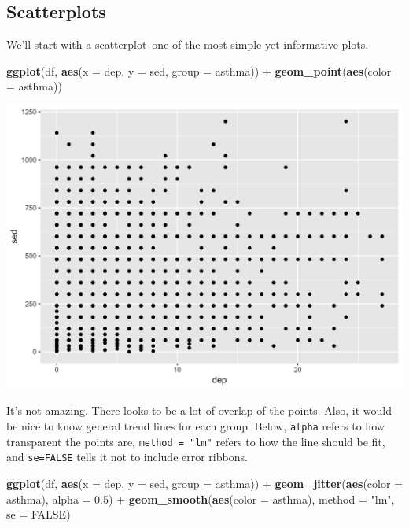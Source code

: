 \documentclass[]{tufte-book}
\newenvironment{Shaded}{}{}
\newcommand{\KeywordTok}[1]{\textcolor[rgb]{0.00,0.44,0.13}{\textbf{#1}}}
\newcommand{\DataTypeTok}[1]{\textcolor[rgb]{0.56,0.13,0.00}{#1}}
\newcommand{\FloatTok}[1]{\textcolor[rgb]{0.25,0.63,0.44}{#1}}
\newcommand{\StringTok}[1]{\textcolor[rgb]{0.25,0.44,0.63}{#1}}
\newcommand{\OtherTok}[1]{\textcolor[rgb]{0.00,0.44,0.13}{#1}}
\newcommand{\OperatorTok}[1]{\textcolor[rgb]{0.40,0.40,0.40}{#1}}
\newcommand{\NormalTok}[1]{#1}
\theoremstyle{definition}
\theoremstyle{definition}
\theoremstyle{remark}
\begin{document}
\subsection*{Scatterplots}\label{scatterplots}

We'll start with a scatterplot--one of the most simple yet informative
plots.

\begin{Shaded}
\begin{Highlighting}[]
\KeywordTok{ggplot}\NormalTok{(df, }\KeywordTok{aes}\NormalTok{(}\DataTypeTok{x =}\NormalTok{ dep, }\DataTypeTok{y =}\NormalTok{ sed, }\DataTypeTok{group =}\NormalTok{ asthma)) }\OperatorTok{+}\StringTok{ }
\StringTok{    }\KeywordTok{geom_point}\NormalTok{(}\KeywordTok{aes}\NormalTok{(}\DataTypeTok{color =}\NormalTok{ asthma))}
\end{Highlighting}
\end{Shaded}

\includegraphics{_main_files/figure-latex/unnamed-chunk-134-1}

It's not amazing. There looks to be a lot of overlap of the points.
Also, it would be nice to know general trend lines for each group.
Below, \texttt{alpha} refers to how transparent the points are,
\texttt{method\ =\ "lm"} refers to how the line should be fit, and
\texttt{se=FALSE} tells it not to include error ribbons.

\begin{Shaded}
\begin{Highlighting}[]
\KeywordTok{ggplot}\NormalTok{(df, }\KeywordTok{aes}\NormalTok{(}\DataTypeTok{x =}\NormalTok{ dep, }\DataTypeTok{y =}\NormalTok{ sed, }\DataTypeTok{group =}\NormalTok{ asthma)) }\OperatorTok{+}\StringTok{ }
\StringTok{    }\KeywordTok{geom_jitter}\NormalTok{(}\KeywordTok{aes}\NormalTok{(}\DataTypeTok{color =}\NormalTok{ asthma), }\DataTypeTok{alpha =} \FloatTok{0.5}\NormalTok{) }\OperatorTok{+}\StringTok{ }
\StringTok{    }\KeywordTok{geom_smooth}\NormalTok{(}\KeywordTok{aes}\NormalTok{(}\DataTypeTok{color =}\NormalTok{ asthma), }\DataTypeTok{method =} \StringTok{"lm"}\NormalTok{, }
        \DataTypeTok{se =} \OtherTok{FALSE}\NormalTok{)}
\end{Highlighting}
\end{Shaded}
\end{document}
